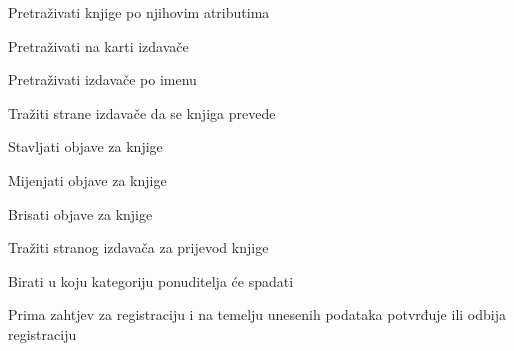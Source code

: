 			
			\begin{packed_enum}
				\item  {}
				
				\begin{packed_enum}
					
					\item Pretraživati knjige po njihovim atributima
					\item Pretraživati na karti izdavače
                    			\item Pretraživati izdavače po imenu
                    			\item Tražiti strane izdavače da se knjiga prevede
						
				
		
				\end{packed_enum}
			
				\item  {}
				
				\begin{packed_enum}
					
					\item Stavljati objave za knjige
					\item Mijenjati objave za knjige
                    			\item Brisati objave za knjige
                    			\item Tražiti stranog izdavača za prijevod knjige
                    			\item Birati u koju kategoriju ponuditelja će spadati
					
				\end{packed_enum}

                		\item {}
                		\begin{packed_enum}
                    			\item Prima zahtjev za registraciju i na temelju unesenih podataka potvrđuje ili odbija registraciju
                		\end{packed_enum}


\end{packed_enum}
